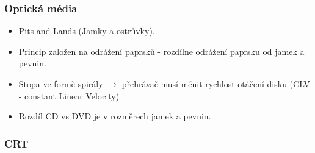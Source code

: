 \documentclass[10pt,a4paper]{article}
\begin{document}
\subsubsection{Optická média}
\begin{itemize}
\item Pits and Lands (Jamky a ostrůvky).
\item Princip založen na odrážení paprsků - rozdílne odrážení paprsku od jamek a pevnin.
\item Stopa ve formě spirály $\rightarrow$ přehrávač musí měnit rychlost otáčení disku (CLV - constant Linear Velocity)
\item Rozdíl CD vs DVD je v rozměrech jamek a pevnin.
\end{itemize}

\subsubsection{CRT}
\end{document}
